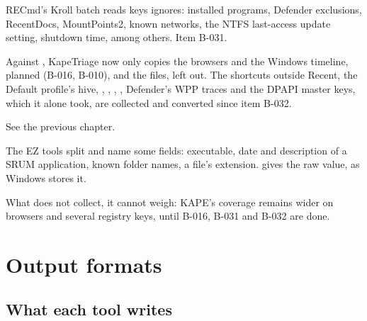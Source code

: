 \documentclass[11pt,a4paper,oneside]{report}
\begin{document}
\begin{description}[style=nextline,leftmargin=1em]
  \item[Registry coverage] RECmd's Kroll batch reads keys \wac{} ignores:
        installed programs, Defender exclusions, RecentDocs, MountPoints2, known
        networks, the NTFS last-access update setting, shutdown time, among
        others. Item B-031.
  \item[File coverage] Against \wac{}, KapeTriage now only copies the browsers
        and the Windows timeline, planned (B-016, B-010), and the
         files, left out. The shortcuts outside Recent, the
        Default profile's hive, , ,
        , , Defender's WPP traces
        and the DPAPI master keys, which it alone took, are collected and
        converted since item B-032.
  \item[Speed on small artefacts and in collection] See the previous chapter.
  \item[Ready-to-read interpretations] The EZ tools split and name some fields:
        executable, date and description of a SRUM application, known folder
        names, a file's extension. \wac{} gives the raw value, as Windows stores
        it.
\end{description}

\begin{attention}
What \wac{} does not collect, it cannot weigh: KAPE's coverage remains wider on
browsers and several registry keys, until B-016, B-031 and B-032 are done.
\end{attention}

\chapter{Output formats}

\section{What each tool writes}
\end{document}
